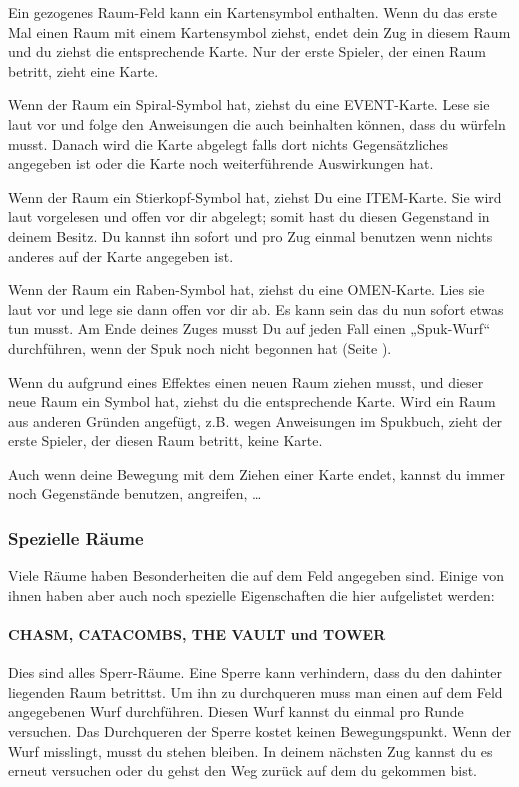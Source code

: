 Ein gezogenes Raum-Feld kann ein Kartensymbol enthalten. Wenn du das erste Mal einen Raum mit einem Kartensymbol ziehst, endet dein Zug in diesem Raum und du ziehst die entsprechende Karte. Nur der erste Spieler, der einen Raum betritt, zieht eine Karte.

Wenn der Raum ein Spiral-Symbol hat, ziehst du eine EVENT-Karte. Lese sie laut vor und folge den Anweisungen die auch beinhalten können, dass du würfeln musst. Danach wird die Karte abgelegt falls dort nichts Gegensätzliches angegeben ist oder die Karte noch weiterführende Auswirkungen hat.

Wenn der Raum ein Stierkopf-Symbol hat, ziehst Du eine ITEM-Karte. Sie wird laut vorgelesen und offen vor dir abgelegt; somit hast du diesen Gegenstand in deinem Besitz. Du kannst ihn sofort und pro Zug einmal benutzen wenn nichts anderes auf der Karte
angegeben ist.

Wenn der Raum ein Raben-Symbol hat, ziehst du eine OMEN-Karte. Lies sie laut vor und lege sie dann offen vor dir ab. Es kann sein das du nun sofort etwas tun musst. Am Ende deines Zuges musst Du auf jeden Fall einen „Spuk-Wurf“ durchführen, wenn der Spuk noch nicht begonnen hat (Seite \pageref{kap:rule:makehauntroll}).

Wenn du aufgrund eines Effektes einen neuen Raum ziehen musst, und dieser neue Raum ein Symbol hat, ziehst du die entsprechende Karte. Wird ein Raum aus anderen Gründen angefügt, z.B. wegen Anweisungen im Spukbuch, zieht der erste Spieler, der diesen Raum betritt, keine Karte.

Auch wenn deine Bewegung mit dem Ziehen einer Karte endet, kannst du immer noch Gegenstände benutzen, angreifen, …

\subsubsection{Spezielle Räume}
\label{kap:rules:specialrooms}

Viele Räume haben Besonderheiten die auf dem Feld angegeben sind. Einige von ihnen haben aber auch noch spezielle Eigenschaften die hier aufgelistet werden:

\paragraph{CHASM, CATACOMBS, THE VAULT und TOWER}

Dies sind alles Sperr-Räume. Eine Sperre kann verhindern, dass du den dahinter liegenden Raum betrittst. Um ihn zu durchqueren muss man einen auf dem Feld angegebenen Wurf durchführen. Diesen Wurf kannst du einmal pro Runde versuchen. Das Durchqueren der Sperre kostet keinen Bewegungspunkt. Wenn der Wurf misslingt, musst du stehen bleiben. In deinem nächsten Zug kannst du es erneut versuchen oder du gehst den Weg zurück auf dem du gekommen bist.

